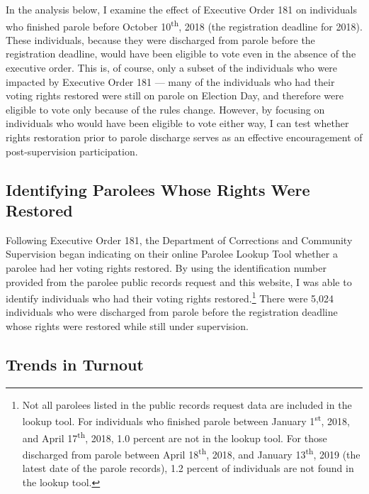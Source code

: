 \documentclass[
  12pt,
]{article}
\begin{document}
In the analysis below, I examine the effect of Executive Order 181 on individuals who finished parole before October 10\textsuperscript{th}, 2018 (the registration deadline for 2018). These individuals, because they were discharged from parole before the registration deadline, would have been eligible to vote even in the absence of the executive order. This is, of course, only a subset of the individuals who were impacted by Executive Order 181 --- many of the individuals who had their voting rights restored were still on parole on Election Day, and therefore were eligible to vote only because of the rules change. However, by focusing on individuals who would have been eligible to vote either way, I can test whether rights restoration prior to parole discharge serves as an effective encouragement of post-supervision participation.

\hypertarget{identifying-parolees-whose-rights-were-restored}{%
\subsection*{Identifying Parolees Whose Rights Were Restored}\label{identifying-parolees-whose-rights-were-restored}}

Following Executive Order 181, the Department of Corrections and Community Supervision began indicating on their online Parolee Lookup Tool whether a parolee had her voting rights restored. By using the identification number provided from the parolee public records request and this website, I was able to identify individuals who had their voting rights restored.\footnote{Not all parolees listed in the public records request data are included in the lookup tool. For individuals who finished parole between January 1\textsuperscript{st}, 2018, and April 17\textsuperscript{th}, 2018, 1.0 percent are not in the lookup tool. For those discharged from parole between April 18\textsuperscript{th}, 2018, and January 13\textsuperscript{th}, 2019 (the latest date of the parole records), 1.2 percent of individuals are not found in the lookup tool.} There were 5,024 individuals who were discharged from parole before the registration deadline whose rights were restored while still under supervision.

\hypertarget{trends-in-turnout}{%
\subsection*{Trends in Turnout}\label{trends-in-turnout}}
\end{document}

